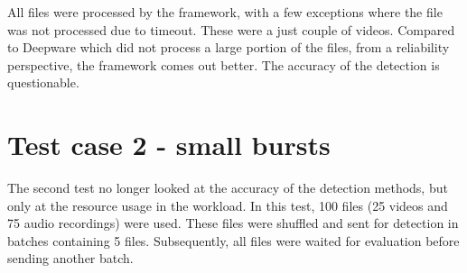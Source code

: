 All files were processed by the framework, with a few exceptions where the file was not processed due to timeout. These were a just couple of videos. Compared to Deepware which did not process a large portion of the files, from a reliability perspective, the framework comes out better. The accuracy of the detection is questionable.

\section{Test case 2 - small bursts}

The second test no longer looked at the accuracy of the detection methods, but only at the resource usage in the workload. In this test, 100 files (25 videos and 75 audio recordings) were used. These files were shuffled and sent for detection in batches containing 5 files. Subsequently, all files were waited for evaluation before sending another batch.


